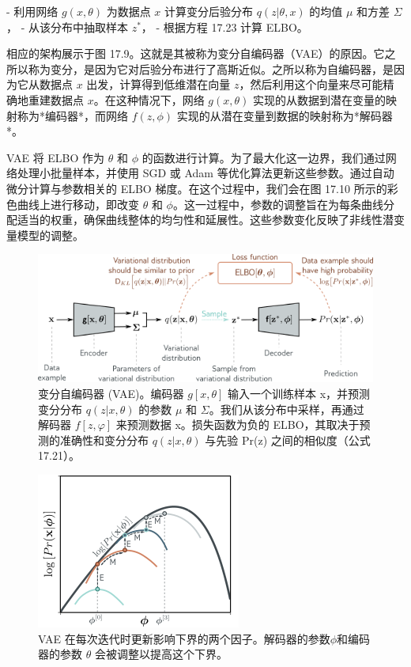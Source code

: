 - 利用网络 \(g(x, \theta)\) 为数据点 \(x\) 计算变分后验分布 \(q(z|\theta, x)\) 的均值 \(\mu\) 和方差 \(\Sigma\)，
- 从该分布中抽取样本 \(z^*\)，
- 根据方程 17.23 计算 ELBO。

相应的架构展示于图 17.9。这就是其被称为变分自编码器（VAE）的原因。它之所以称为变分，是因为它对后验分布进行了高斯近似。之所以称为自编码器，是因为它从数据点 \(x\) 出发，计算得到低维潜在向量 \(z\)，然后利用这个向量来尽可能精确地重建数据点 \(x\)。在这种情况下，网络 \(g(x, \theta)\) 实现的从数据到潜在变量的映射称为*编码器*，而网络 \(f(z, \phi)\) 实现的从潜在变量到数据的映射称为*解码器*。

VAE 将 ELBO 作为 \(\theta\) 和 \(\phi\) 的函数进行计算。为了最大化这一边界，我们通过网络处理小批量样本，并使用 SGD 或 Adam 等优化算法更新这些参数。通过自动微分计算与参数相关的 ELBO 梯度。在这个过程中，我们会在图 17.10 所示的彩色曲线上进行移动，即改变 \(\theta\) 和 \(\phi\)。这一过程中，参数的调整旨在为每条曲线分配适当的权重，确保曲线整体的均匀性和延展性。这些参数变化反映了非线性潜变量模型的调整。

\begin{figure}[ht!]
\centering
\includegraphics[width=0.7\linewidth]{png/chapter17/VAEArch.png}
\caption{变分自编码器 (VAE)。编码器 \(g[x, \theta]\) 输入一个训练样本 x，并预测变分分布 \(q(z|x, \theta)\) 的参数 \(\mu\) 和 \(\Sigma\)。我们从该分布中采样，再通过解码器 \(f[z, \varphi]\) 来预测数据 x。损失函数为负的 ELBO，其取决于预测的准确性和变分分布 \(q(z|x, \theta)\) 与先验 Pr(z) 之间的相似度（公式 17.21）。}
\end{figure}


\begin{figure}[ht!]
\centering
\includegraphics[width=0.7\linewidth]{png/chapter17/VAEEMOpt.png}
\caption{VAE 在每次迭代时更新影响下界的两个因子。解码器的参数\(\phi\)和编码器的参数 \(\theta\) 会被调整以提高这个下界。}
\end{figure}


